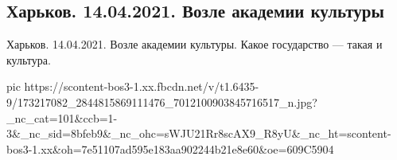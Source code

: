  
 
 
 
 
\subsection{Харьков. 14.04.2021. Возле академии культуры}
\label{sec:14_04_2021.fb.kevorkjan_konstantin.1.harkov_kafedra_vata}

Харьков. 14.04.2021. Возле академии культуры. Какое государство — такая и культура.

\ifcmt
  pic https://scontent-bos3-1.xx.fbcdn.net/v/t1.6435-9/173217082_2844815869111476_7012100903845716517_n.jpg?_nc_cat=101&ccb=1-3&_nc_sid=8bfeb9&_nc_ohc=sWJU21Rr8scAX9_R8yU&_nc_ht=scontent-bos3-1.xx&oh=7e51107ad595e183aa902244b21e8e60&oe=609C5904
\fi

